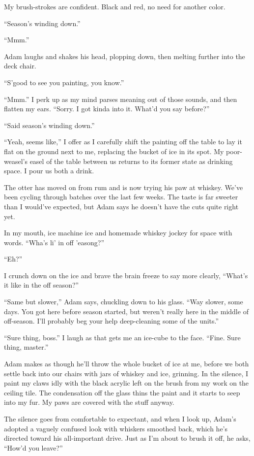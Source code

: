 My brush-strokes are confident. Black and red, no need for another color.

``Season's winding down.''

``Mmm.''

Adam laughs and shakes his head, plopping down, then melting further into the deck chair.

``S'good to see you painting, you know.''

``Mmm.'' I perk up as my mind parses meaning out of those sounds, and then flatten my ears. ``Sorry. I got kinda into it. What'd you say before?''

``Said season's winding down.''

``Yeah, seems like,'' I offer as I carefully shift the painting off the table to lay it flat on the ground next to me, replacing the bucket of ice in its spot. My poor-weasel's easel of the table between us returns to its former state as drinking space. I pour us both a drink.

The otter has moved on from rum and is now trying his paw at whiskey. We've been cycling through batches over the last few weeks. The taste is far sweeter than I would've expected, but Adam says he doesn't have the cuts quite right yet.

In my mouth, ice machine ice and homemade whiskey jockey for space with words. ``Wha's li' in off 'easong?''

``Eh?''

I crunch down on the ice and brave the brain freeze to say more clearly, ``What's it like in the off season?''

``Same but slower,'' Adam says, chuckling down to his glass. ``Way slower, some days. You got here before season started, but weren't really here in the middle of off-season. I'll probably beg your help deep-cleaning some of the units.''

``Sure thing, boss.'' I laugh as that gets me an ice-cube to the face. ``Fine. Sure thing, master.''

Adam makes as though he'll throw the whole bucket of ice at me, before we both settle back into our chairs with jars of whiskey and ice, grinning. In the silence, I paint my claws idly with the black acrylic left on the brush from my work on the ceiling tile. The condensation off the glass thins the paint and it starts to seep into my fur. My paws are covered with the stuff anyway.

The silence goes from comfortable to expectant, and when I look up, Adam's adopted a vaguely confused look with whiskers smoothed back, which he's directed toward his all-important drive. Just as I'm about to brush it off, he asks, ``How'd you leave?''

